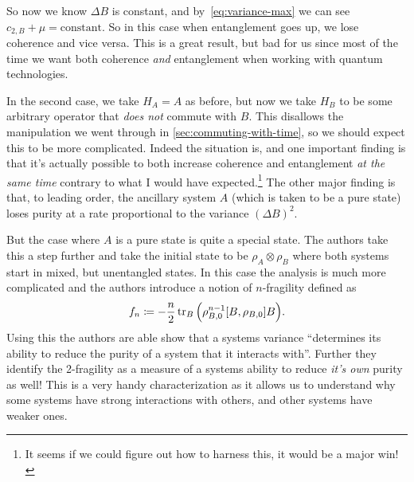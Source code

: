 \documentclass[11pt,english]{article}
\theoremstyle{definition}
\newcommand{\twonormE}[1][\rho]{c_{2,B}}
\begin{document}
So now we know $\Delta B$ is constant, and by~\cref{eq:variance-max} we can see $\twonormE + \mu = \text{constant}$. So in this case when entanglement goes up, we lose coherence and vice versa. This is a great result, but bad for us since most of the time we want both coherence \emph{and} entanglement when working with quantum technologies.

In the second case, we take $H_A = A$ as before, but now we take $H_B$ to be some arbitrary operator that \emph{does not} commute with $B$. This disallows the manipulation we went through in \cref{sec:commuting-with-time}, so we should expect this to be more complicated. Indeed the situation is, and one important finding is that it's actually possible to both increase coherence and entanglement \emph{at the same time} contrary to what I would have expected.\footnote{It seems if we could figure out how to harness this, it would be a major win!} The other major finding is that, to leading order, the ancillary system $A$ (which is taken to be a pure state) loses purity at a rate proportional to the variance $(\Delta B)^2$.

But the case where $A$ is a pure state is quite a special state. The authors take this a step further and take the initial state to be $\rho_A\otimes \rho_B$ where both systems start in mixed, but unentangled states. In this case the analysis is much more complicated and the authors introduce a notion of $n$-fragility defined as
\begin{equation*}
	f_n\coloneqq -\frac{n}{2}\tr_B\qty(\rho_{B,0}^{n-1}\comm{B}{\rho_{B,0}}B).
\end{equation*}
Using this the authors are able show that a systems variance ``determines its ability to reduce the purity of a system that it interacts with''. Further they identify the 2-fragility as a measure of a systems ability to reduce \emph{it's own} purity as well! This is a very handy characterization as it allows us to understand why some systems have strong interactions with others, and other systems have weaker ones.
\end{document}
